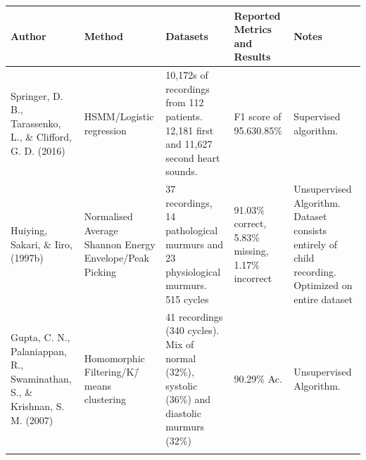 \documentclass[titlepage, 12pt]{scrartcl} \usepackage{enumitem}
\newcommand{\dtoprule}{\specialrule{1pt}{0pt}{1.4pt}%
            \specialrule{1pt}{0pt}{\belowrulesep}%
            }
\newcommand{\dbottomrule}{\specialrule{1pt}{0pt}{1.4pt}%
            \specialrule{1pt}{0pt}{\belowrulesep}%
            }
\begin{document}
\begin{landscape}
\begin{table}[htbp]
     \label{SegmentationTable}
\small
{}
\begin{tabulary}{\linewidth}{LLLLL}
\dtoprule
Author                                                                    &
Method                                                  & Datasets
                                                        & Reported Metrics and
Results                      & Notes
\\ \bottomrule
Springer, D. B., Tarassenko, L., \& Clifford, G. D. (2016)                & HSMM/Logistic regression                                & 10,172s of recordings from 112 patients. 12,181 first and 11,627 second heart sounds.          & F1 score of 95.630.85\%                          & Supervised algorithm.                                                                              \\
Huiying, Sakari, \& Iiro, (1997b)                                         & Normalised Average Shannon Energy Envelope/Peak Picking & 37 recordings, 14 pathological murmurs and 23 physiological murmurs. 515 cycles                & 91.03\% correct, 5.83\% missing, 1.17\% incorrect & Unsupervised Algorithm.  Dataset consists entirely of child recording. Optimized on entire dataset \\
Gupta, C. N., Palaniappan, R., Swaminathan, S., \& Krishnan, S. M. (2007) &
Homomorphic Filtering\slash K\=/means clustering                & 41 recordings (340 cycles). Mix of normal (32\%), systolic (36\%) and diastolic murmurs (32\%) & 90.29\% Ac.                           & Unsupervised Algorithm.                                                                            \\
\dbottomrule \\
\end{tabulary}
\end{table}
\end{landscape}
\restoregeometry
\end{document}

